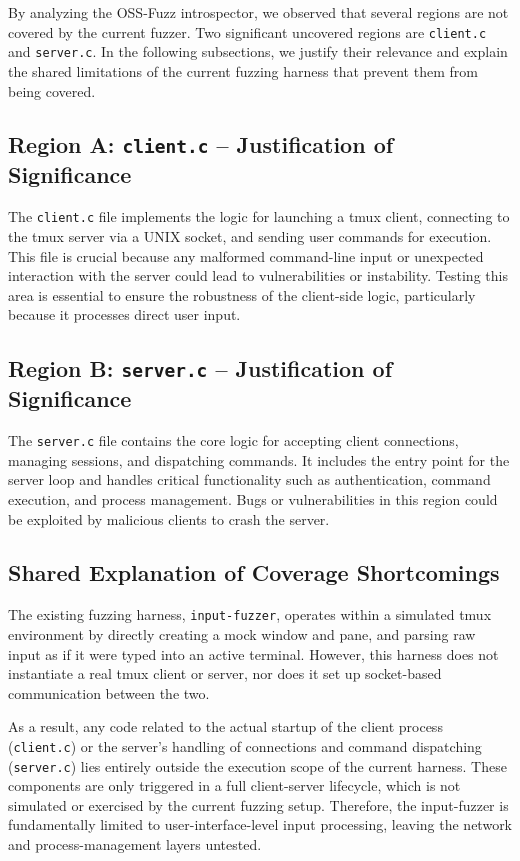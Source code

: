 By analyzing the OSS-Fuzz introspector, we observed that several regions are not
covered by the current fuzzer. Two significant uncovered regions are
\texttt{client.c} and \texttt{server.c}. In the following subsections, we
justify their relevance and explain the shared limitations of the current
fuzzing harness that prevent them from being covered.

\subsection{Region A: \texttt{client.c} – Justification of Significance}

The \texttt{client.c} file implements the logic for launching a tmux client, connecting to the tmux server via a UNIX socket, and sending user commands for execution. This file is crucial because any malformed command-line input or unexpected interaction with the server could lead to vulnerabilities or instability. Testing this area is essential to ensure the robustness of the client-side logic, particularly because it processes direct user input.

\subsection{Region B: \texttt{server.c} – Justification of Significance}

The \texttt{server.c} file contains the core logic for accepting client connections, managing sessions, and dispatching commands. It includes the entry point for the server loop and handles critical functionality such as authentication, command execution, and process management. Bugs or vulnerabilities in this region could be exploited by malicious clients to crash the server.

\subsection*{Shared Explanation of Coverage Shortcomings}

The existing fuzzing harness, \texttt{input-fuzzer}, operates within a simulated tmux environment by directly creating a mock window and pane, and parsing raw input as if it were typed into an active terminal. However, this harness does not instantiate a real tmux client or server, nor does it set up socket-based communication between the two.

As a result, any code related to the actual startup of the client process (\texttt{client.c}) or the server's handling of connections and command dispatching (\texttt{server.c}) lies entirely outside the execution scope of the current harness. These components are only triggered in a full client-server lifecycle, which is not simulated or exercised by the current fuzzing setup. Therefore, the input-fuzzer is fundamentally limited to user-interface-level input processing, leaving the network and process-management layers untested.
